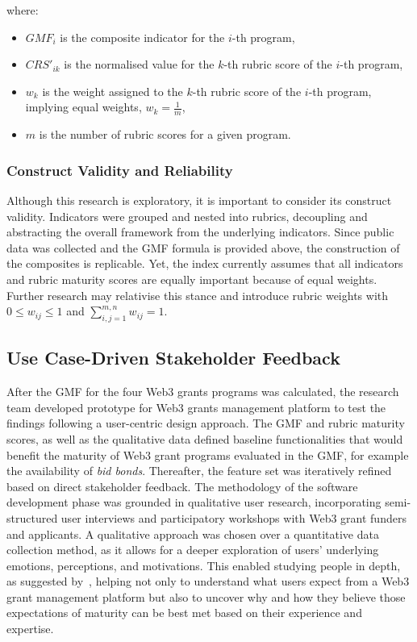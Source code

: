 \documentclass[conference]{IEEEtran}
\begin{document}
where:

\begin{itemize}
    \item \( GMF_i \) is the composite indicator for the \( i \)-th program,
    \item \( CRS'_{ik} \) is the normalised value for the \( k \)-th rubric score of the \( i \)-th program,
    \item \( w_k \) is the weight assigned to the \( k \)-th rubric score of the \( i \)-th program, implying equal weights, \( w_k = \frac{1}{m} \),
    \item \( m \) is the number of rubric scores for a given program.
\end{itemize}\vspace{7pt}
\normalsize

\subsubsection{Construct Validity and Reliability}\label{sec_3.2.3}

Although this research is exploratory, it is important to consider its construct validity. Indicators were grouped and nested into rubrics, decoupling and abstracting the overall framework from the underlying indicators. Since public data was collected and the GMF formula is provided above, the construction of the composites is replicable. Yet, the index currently assumes that all indicators and rubric maturity scores are equally important because of equal weights. Further research may relativise this stance and introduce rubric weights with \( 0 \leq w_{ij} \leq 1 \) and \( \sum_{i,j=1}^{m,n} w_{ij} = 1\).

\subsection{Use Case-Driven Stakeholder Feedback}\label{sec_3.3}

After the GMF for the four Web3 grants programs was calculated, the research team developed prototype for Web3 grants management platform to test the findings following a user-centric design approach. The GMF and rubric maturity scores, as well as the qualitative data defined baseline functionalities that would benefit the maturity of Web3 grant programs evaluated in the GMF, for example the availability of \textit{bid bonds}. Thereafter, the feature set was iteratively refined based on direct stakeholder feedback. The methodology of the software development phase was grounded in qualitative user research, incorporating semi-structured user interviews and participatory workshops with Web3 grant funders and applicants. A qualitative approach was chosen over a quantitative data collection method, as it allows for a deeper exploration of users' underlying emotions, perceptions, and motivations. This enabled studying people in depth, as suggested by~\cite{norman_design_2013}, helping not only to understand what users expect from a Web3 grant management platform but also to uncover why and how they believe those expectations of maturity can be best met based on their experience and expertise.
\end{document}
